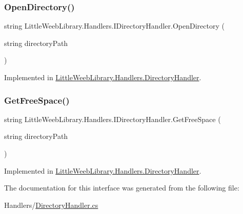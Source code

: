 \subsubsection{\texorpdfstring{Open\+Directory()}{OpenDirectory()}}
{\footnotesize\ttfamily string Little\+Weeb\+Library.\+Handlers.\+I\+Directory\+Handler.\+Open\+Directory (\begin{DoxyParamCaption}\item[{string}]{directory\+Path }\end{DoxyParamCaption})}



Implemented in \mbox{\hyperlink{class_little_weeb_library_1_1_handlers_1_1_directory_handler_a4f3f5841ead561873cc5130efc6294aa}{Little\+Weeb\+Library.\+Handlers.\+Directory\+Handler}}.

\mbox{\label{interface_little_weeb_library_1_1_handlers_1_1_i_directory_handler_aa969b0771c2482aa5b3fed0d5b9fae65}} 
\subsubsection{\texorpdfstring{Get\+Free\+Space()}{GetFreeSpace()}}
{\footnotesize\ttfamily string Little\+Weeb\+Library.\+Handlers.\+I\+Directory\+Handler.\+Get\+Free\+Space (\begin{DoxyParamCaption}\item[{string}]{directory\+Path }\end{DoxyParamCaption})}



Implemented in \mbox{\hyperlink{class_little_weeb_library_1_1_handlers_1_1_directory_handler_aa439a303572de6bf09438d38a7fa4698}{Little\+Weeb\+Library.\+Handlers.\+Directory\+Handler}}.



The documentation for this interface was generated from the following file\+:\begin{DoxyCompactItemize}
\item 
Handlers/\mbox{\hyperlink{_directory_handler_8cs}{Directory\+Handler.\+cs}}\end{DoxyCompactItemize}
